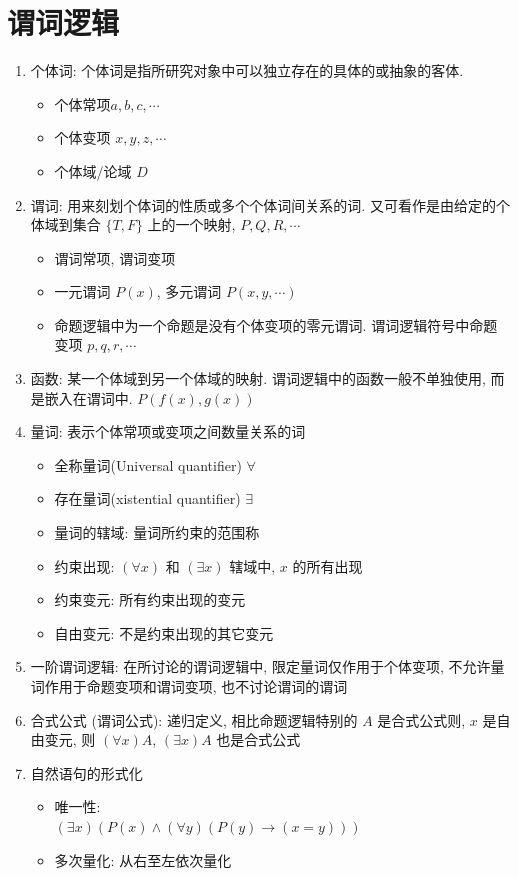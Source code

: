 \documentclass[11pt,a4paper,twocolumn,fleqn]{article} %
\begin{document}
\section{谓词逻辑} %
\label{sec:predicate_logic}
\begin{enumerate}
	\item 个体词: 个体词是指所研究对象中可以独立存在的具体的或抽象的客体. 
	\begin{itemize}
		\item 个体常项$a,b,c,\cdots$
		\item 个体变项 $x, y, z, \cdots$
		\item 个体域/论域 $D$
	\end{itemize}
	\item 谓词: 用来刻划个体词的性质或多个个体词间关系的词. 
	又可看作是由给定的个体域到集合 $\{T, F\}$ 上的一个映射, $P, Q, R, \cdots$
	\begin{itemize}
		\item 谓词常项, 谓词变项
		\item 一元谓词 $P(x)$, 多元谓词 $P(x, y, \cdots)$
		\item 命题逻辑中为一个命题是没有个体变项的零元谓词. 
		谓词逻辑符号中命题变项 $p, q, r, \cdots$
	\end{itemize}
	\item 函数: 某一个体域到另一个体域的映射. 谓词逻辑中的函数一般不单独使用, 
	而是嵌入在谓词中. $P(f(x), g(x))$
	\item 量词: 表示个体常项或变项之间数量关系的词
	\begin{itemize}
		\item 全称量词(Universal quantifier) $\forall$ 
		\item 存在量词(xistential quantifier) $\exists$ 
		\item 量词的辖域: 量词所约束的范围称
		\item 约束出现: $(\forall x)$ 和 $(\exists x)$ 辖域中, $x$ 的所有出现
		\item 约束变元: 所有约束出现的变元
		\item 自由变元: 不是约束出现的其它变元
	\end{itemize}
	\item 一阶谓词逻辑: 在所讨论的谓词逻辑中, 限定量词仅作用于个体变项, 
	不允许量词作用于命题变项和谓词变项, 也不讨论谓词的谓词
	\item 合式公式 (谓词公式): 递归定义, 相比命题逻辑特别的 $A$ 是合式公式则, 
	$x$ 是自由变元, 则 $(\forall x) A$, $(\exists x) A$ 也是合式公式
	\item 自然语句的形式化
	\begin{itemize}
		\item 唯一性: \\ 
		$(\exists x)(P(x) \land (\forall y) (P(y)\to (x=y)))$
		\item 多次量化: 从右至左依次量化
	\end{itemize}
\end{enumerate}
\end{document}
